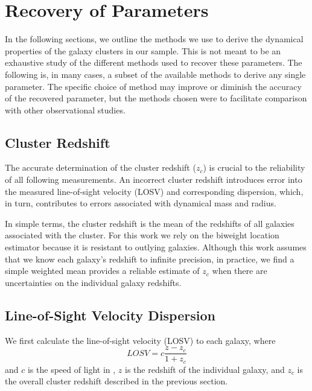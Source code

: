 \documentclass[fleqn,usenatbib]{mnras}
\begin{document}
\section{Recovery of Parameters}\label{sec:recovery}
 In the following sections, we outline the methods we use to derive the dynamical properties of the galaxy clusters in our sample. This is not meant to be an exhaustive study of the different methods used to recover these parameters. The following is, in many cases, a subset of the available methods to derive any single parameter. The specific choice of method may improve or diminish the accuracy of the recovered parameter, but the methods chosen were to facilitate comparison with other observational studies. 

\subsection{Cluster Redshift}
The accurate determination of the cluster redshift ($z_c$) is crucial to the reliability of all following measurements. An incorrect cluster redshift introduces error into the measured line-of-sight velocity (LOSV) and corresponding dispersion, which, in turn, contributes to errors associated with dynamical mass and radius. 

In simple terms, the cluster redshift is the mean of the redshifts of all galaxies associated with the cluster. For this work we rely on the biweight location estimator \citep{Beers1990} because it is resistant to outlying galaxies. Although this work assumes that we know each galaxy's redshift to infinite precision, in practice, we find a simple weighted mean provides a reliable estimate of $z_c$ when there are uncertainties on the individual galaxy redshifts. 

\subsection{Line-of-Sight Velocity Dispersion}\label{sec: LOSVD}
We first calculate the line-of-sight velocity (LOSV) to each galaxy, where
\begin{equation}
	LOSV = c\frac{z - z_c}{1+z_c}
\end{equation}
and $c$ is the speed of light in \kms, $z$ is the redshift of the individual galaxy, and $z_c$ is the overall cluster redshift described in the previous section.
\end{document}

